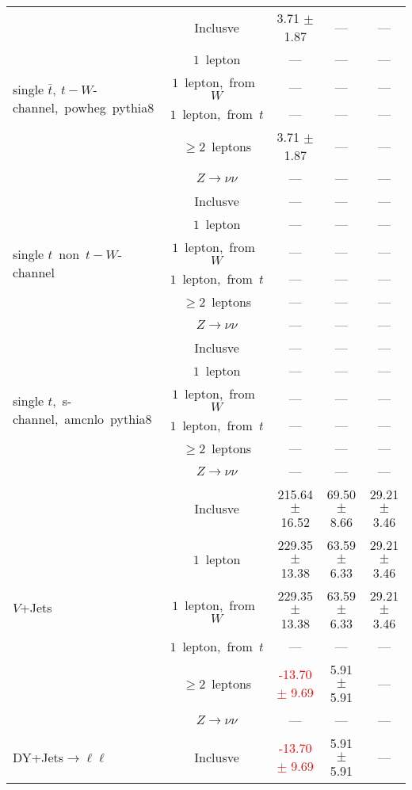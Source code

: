 \documentclass{article}
\begin{document}
\begin{longtable}{|l|c|c|c|c|}
\hline 
\multirow{6}{*}{single $\bar{t},~t-W$-channel,~powheg~pythia8} & Inclusve  & 3.71 $\pm$ 1.87  & ---  & --- \\* 
 & $1$~lepton  & ---  & ---  & --- \\* 
 & $1$~lepton,~from~$W$  & ---  & ---  & --- \\* 
 & $1$~lepton,~from~$t$  & ---  & ---  & --- \\* 
 & $\ge2$~leptons  & 3.71 $\pm$ 1.87  & ---  & --- \\* 
 & $Z\rightarrow\nu\nu$  & ---  & ---  & --- \\* 
\hline 
\multirow{6}{*}{single $t$~non~$t-W$-channel} & Inclusve  & ---  & ---  & --- \\* 
 & $1$~lepton  & ---  & ---  & --- \\* 
 & $1$~lepton,~from~$W$  & ---  & ---  & --- \\* 
 & $1$~lepton,~from~$t$  & ---  & ---  & --- \\* 
 & $\ge2$~leptons  & ---  & ---  & --- \\* 
 & $Z\rightarrow\nu\nu$  & ---  & ---  & --- \\* 
\hline 
\multirow{6}{*}{single $t$,~s-channel,~amcnlo~pythia8} & Inclusve  & ---  & ---  & --- \\* 
 & $1$~lepton  & ---  & ---  & --- \\* 
 & $1$~lepton,~from~$W$  & ---  & ---  & --- \\* 
 & $1$~lepton,~from~$t$  & ---  & ---  & --- \\* 
 & $\ge2$~leptons  & ---  & ---  & --- \\* 
 & $Z\rightarrow\nu\nu$  & ---  & ---  & --- \\* 
\hline 
\multirow{6}{*}{$V$+Jets} & Inclusve  & 215.64 $\pm$ 16.52  & 69.50 $\pm$ 8.66  & 29.21 $\pm$ 3.46 \\* 
 & $1$~lepton  & 229.35 $\pm$ 13.38  & 63.59 $\pm$ 6.33  & 29.21 $\pm$ 3.46 \\* 
 & $1$~lepton,~from~$W$  & 229.35 $\pm$ 13.38  & 63.59 $\pm$ 6.33  & 29.21 $\pm$ 3.46 \\* 
 & $1$~lepton,~from~$t$  & ---  & ---  & --- \\* 
 & $\ge2$~leptons  & \textcolor{red}{ -13.70 $\pm$ 9.69 }  & 5.91 $\pm$ 5.91  & --- \\* 
 & $Z\rightarrow\nu\nu$  & ---  & ---  & --- \\* 
\hline 
\multirow{6}{*}{DY+Jets$\rightarrow\ell\ell$} & Inclusve  & \textcolor{red}{ -13.70 $\pm$ 9.69 }  & 5.91 $\pm$ 5.91  & --- \\* 

\end{longtable}
\end{document}
